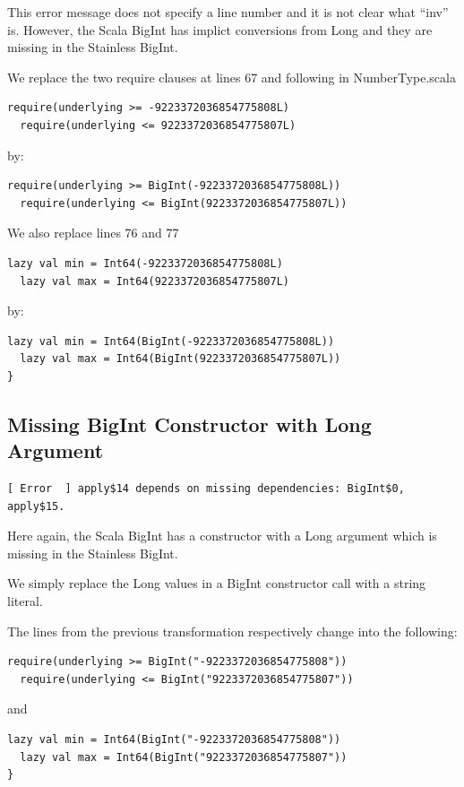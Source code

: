 \documentclass[runningheads]{llncs}
\begin{document}
This error message does not specify a line number and it is not clear
what ``inv'' is. However, the Scala BigInt has implict conversions
from Long and they are missing in the Stainless BigInt.



We replace the two require clauses at lines 67 and following in NumberType.scala

\begin{lstlisting}[style=scala]
  require(underlying >= -9223372036854775808L)
  require(underlying <= 9223372036854775807L)
\end{lstlisting}

by:
\begin{lstlisting}[style=scala]
  require(underlying >= BigInt(-9223372036854775808L))
  require(underlying <= BigInt(9223372036854775807L))
\end{lstlisting}

We also replace lines 76 and 77
\begin{lstlisting}[style=scala]
  lazy val min = Int64(-9223372036854775808L)
  lazy val max = Int64(9223372036854775807L)
\end{lstlisting}

by:
\begin{lstlisting}[style=scala]
  lazy val min = Int64(BigInt(-9223372036854775808L))
  lazy val max = Int64(BigInt(9223372036854775807L))
}
\end{lstlisting}


\subsection{Missing BigInt Constructor with Long Argument}

\begin{lstlisting}[style=stainless]
[ Error  ] apply$14 depends on missing dependencies: BigInt$0, apply$15.
\end{lstlisting}

Here again, the Scala BigInt has a constructor with a Long argument
which is missing in the Stainless BigInt.

We simply replace the Long values in a BigInt constructor call with a string
literal.

The lines from the previous transformation respectively change into
the following:

\begin{lstlisting}[style=scala]
  require(underlying >= BigInt("-9223372036854775808"))
  require(underlying <= BigInt("9223372036854775807"))
\end{lstlisting}

and

\begin{lstlisting}[style=scala]
  lazy val min = Int64(BigInt("-9223372036854775808"))
  lazy val max = Int64(BigInt("9223372036854775807"))
}
\end{lstlisting}
\end{document}
